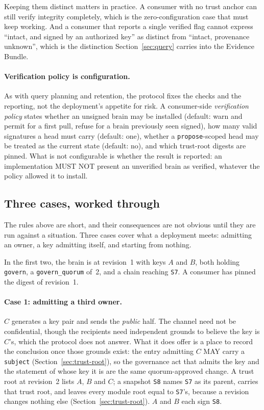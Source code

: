 \documentclass[11pt,a4paper]{article}
\begin{document}
Keeping them distinct matters in practice. A consumer with no trust anchor can
still verify integrity completely, which is the zero-configuration case that
must keep working. And a consumer that reports a single verified flag cannot
express ``intact, and signed by an authorized key'' as distinct from ``intact,
provenance unknown'', which is the distinction Section~\ref{sec:query} carries
into the Evidence Bundle.

\paragraph{Verification policy is configuration.}
As with query planning and retention, the protocol fixes the checks and the
reporting, not the deployment's appetite for risk. A consumer-side
\emph{verification policy} states whether an unsigned brain may be installed
(default: warn and permit for a first pull, refuse for a brain previously seen
signed), how many valid signatures a head must carry (default: one), whether a
\texttt{propose}-scoped head may be treated as the current state (default: no),
and which trust-root digests are pinned. What is not configurable is whether the
result is reported: an implementation MUST NOT present an unverified brain as
verified, whatever the policy allowed it to install.

\subsection{Three cases, worked through}
\label{sec:cases}

The rules above are short, and their consequences are not obvious until they
are run against a situation. Three cases cover what a deployment meets:
admitting an owner, a key admitting itself, and starting from nothing.

In the first two, the brain is at revision~1 with keys $A$ and $B$, both holding
\texttt{govern}, a \texttt{govern\_quorum} of~2, and a chain reaching
\texttt{S7}. A consumer has pinned the digest of revision~1.

\paragraph{Case 1: admitting a third owner.}
$C$ generates a key pair and sends the \emph{public} half. The channel need
not be confidential, though the recipients need independent grounds to believe
the key is $C$'s, which the protocol does not answer. What it does offer is a
place to record the conclusion once those grounds exist: the entry admitting
$C$ MAY carry a \texttt{subject} (Section~\ref{sec:trust-root}), so the
governance act that admits the key and the statement of whose key it is are the
same quorum-approved change. A trust root at
revision~2 lists $A$, $B$ and $C$; a snapshot \texttt{S8} names \texttt{S7} as
its parent, carries that trust root, and leaves every module root equal to
\texttt{S7}'s, because a revision changes nothing else
(Section~\ref{sec:trust-root}). $A$ and $B$ each sign \texttt{S8}.
\end{document}

